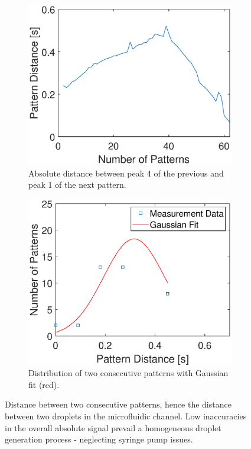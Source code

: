 \begin{figure}[h]
	\begin{subfigure}[l]{0.49\textwidth} 
		\centering
		\includegraphics[clip,trim={0mm 0mm 0mm 0mm}, width=1.1\linewidth]{Ressourcen/Results/Measurement/Dist_abs}
		\caption{Absolute distance between peak 4 of the previous and peak 1 of the next pattern.}
		\label{fig:exp:pattern:Dist:abs}
	\end{subfigure}
	\hfill
	\begin{subfigure}[r]{0.49\textwidth} 
		\centering
		\includegraphics[clip,trim={0mm 0mm 0mm 0mm}, width=1.1\linewidth]{Ressourcen/Results/Measurement/Dist_hist}
		\caption{Distribution of two consecutive patterns with Gaussian fit (red).}
		\label{fig:exp:pattern:Dist:hist}
	\end{subfigure}
	\caption{Distance between two consecutive patterns, hence the distance between two droplets in the microfluidic channel. Low inaccuracies in the overall absolute signal prevail a homogeneous droplet generation process - neglecting syringe pump issues.}
	\label{fig:exp:pattern:Dist}
\end{figure}
\clearpage
\newpage\null\thispagestyle{empty}\newpage
